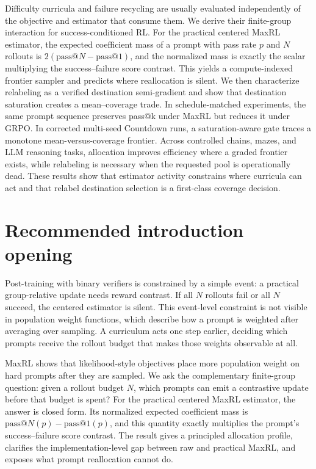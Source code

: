 \documentclass[11pt]{article}
\makeatletter
\newcommand{\PassAt}[1]{\mathrm{pass@}#1}
\theoremstyle{definition}
\theoremstyle{remark}
\makeatother
\begin{document}
\begin{rewritebox}[title={\textbf{Post-replication abstract template}}]
Difficulty curricula and failure recycling are usually evaluated independently of the objective and estimator that consume them. We derive their finite-group interaction for success-conditioned RL. For the practical centered MaxRL estimator, the expected coefficient mass of a prompt with pass rate $p$ and $N$ rollouts is $2(\PassAt{N}-\PassAt{1})$, and the normalized mass is exactly the scalar multiplying the success--failure score contrast. This yields a compute-indexed frontier sampler and predicts where reallocation is silent. We then characterize relabeling as a verified destination semi-gradient and show that destination saturation creates a mean--coverage trade. In schedule-matched experiments, the same prompt sequence preserves pass@k under MaxRL but reduces it under GRPO. In corrected multi-seed Countdown runs, a saturation-aware gate traces a monotone mean-versus-coverage frontier. Across controlled chains, mazes, and LLM reasoning tasks, allocation improves efficiency where a graded frontier exists, while relabeling is necessary when the requested pool is operationally dead. These results show that estimator activity constrains where curricula can act and that relabel destination selection is a first-class coverage decision.
\end{rewritebox}

\section{Recommended introduction opening}

\begin{rewritebox}[title={\textbf{Opening two paragraphs---ready to paste}}]
Post-training with binary verifiers is constrained by a simple event: a practical group-relative update needs reward contrast. If all $N$ rollouts fail or all $N$ succeed, the centered estimator is silent. This event-level constraint is not visible in population weight functions, which describe how a prompt is weighted after averaging over sampling. A curriculum acts one step earlier, deciding which prompts receive the rollout budget that makes those weights observable at all.

MaxRL shows that likelihood-style objectives place more population weight on hard prompts after they are sampled. We ask the complementary finite-group question: given a rollout budget $N$, which prompts can emit a contrastive update before that budget is spent? For the practical centered MaxRL estimator, the answer is closed form. Its normalized expected coefficient mass is $\PassAt{N}(p)-\PassAt{1}(p)$, and this quantity exactly multiplies the prompt's success--failure score contrast. The result gives a principled allocation profile, clarifies the implementation-level gap between raw and practical MaxRL, and exposes what prompt reallocation cannot do.
\end{rewritebox}
\end{document}
